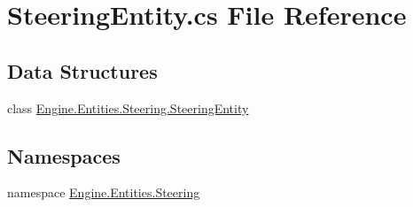 \hypertarget{a00038}{}\section{Steering\+Entity.\+cs File Reference}
\label{a00038}
\subsection*{Data Structures}
\begin{DoxyCompactItemize}
\item 
class \hyperlink{a00342}{Engine.\+Entities.\+Steering.\+Steering\+Entity}
\end{DoxyCompactItemize}
\subsection*{Namespaces}
\begin{DoxyCompactItemize}
\item 
namespace \hyperlink{a00244}{Engine.\+Entities.\+Steering}
\end{DoxyCompactItemize}
